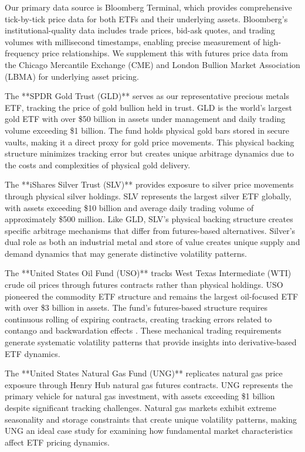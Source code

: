 Our primary data source is Bloomberg Terminal, which provides comprehensive tick-by-tick price data for both ETFs and their underlying assets. Bloomberg's institutional-quality data includes trade prices, bid-ask quotes, and trading volumes with millisecond timestamps, enabling precise measurement of high-frequency price relationships. We supplement this with futures price data from the Chicago Mercantile Exchange (CME) and London Bullion Market Association (LBMA) for underlying asset pricing.

The **SPDR Gold Trust (GLD)** serves as our representative precious metals ETF, tracking the price of gold bullion held in trust. GLD is the world's largest gold ETF with over \$50 billion in assets under management and daily trading volume exceeding \$1 billion. The fund holds physical gold bars stored in secure vaults, making it a direct proxy for gold price movements. This physical backing structure minimizes tracking error but creates unique arbitrage dynamics due to the costs and complexities of physical gold delivery.

The **iShares Silver Trust (SLV)** provides exposure to silver price movements through physical silver holdings. SLV represents the largest silver ETF globally, with assets exceeding \$10 billion and average daily trading volume of approximately \$500 million. Like GLD, SLV's physical backing structure creates specific arbitrage mechanisms that differ from futures-based alternatives. Silver's dual role as both an industrial metal and store of value creates unique supply and demand dynamics that may generate distinctive volatility patterns.

The **United States Oil Fund (USO)** tracks West Texas Intermediate (WTI) crude oil prices through futures contracts rather than physical holdings. USO pioneered the commodity ETF structure and remains the largest oil-focused ETF with over \$3 billion in assets. The fund's futures-based structure requires continuous rolling of expiring contracts, creating tracking errors related to contango and backwardation effects \citep{todorov2021etf}. These mechanical trading requirements generate systematic volatility patterns that provide insights into derivative-based ETF dynamics.

The **United States Natural Gas Fund (UNG)** replicates natural gas price exposure through Henry Hub natural gas futures contracts. UNG represents the primary vehicle for natural gas investment, with assets exceeding \$1 billion despite significant tracking challenges. Natural gas markets exhibit extreme seasonality and storage constraints that create unique volatility patterns, making UNG an ideal case study for examining how fundamental market characteristics affect ETF pricing dynamics.

